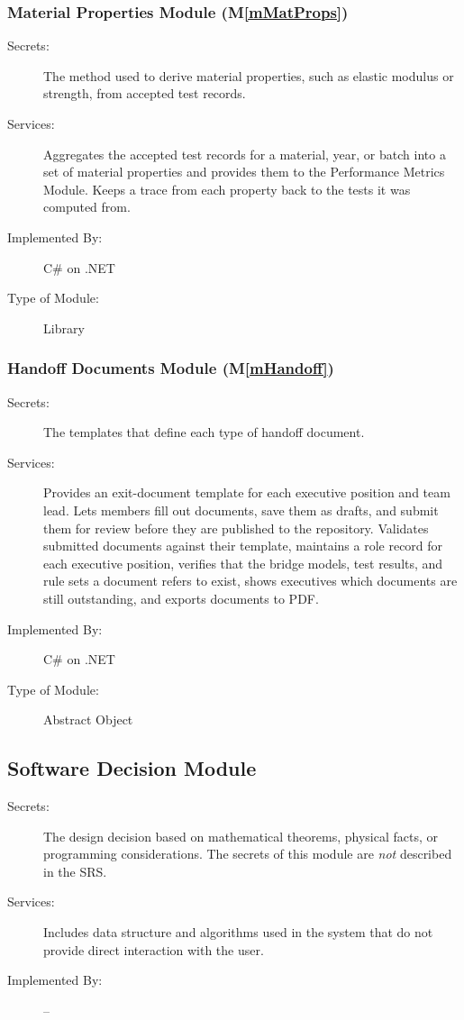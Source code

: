 \documentclass[12pt, titlepage]{article}
\begin{document}
\subsubsection{Material Properties Module (M\ref*{mMatProps})}\label{mMatProps:dec}

\begin{description}
\item[Secrets:] The method used to derive material properties, such as elastic modulus or strength, from accepted test records.
\item[Services:] Aggregates the accepted test records for a material, year, or
  batch into a set of material properties and provides them to the Performance
  Metrics Module. Keeps a trace from each property back to the tests it was
  computed from.
\item[Implemented By:] C\# on .NET
\item[Type of Module:] Library
\end{description}

\subsubsection{Handoff Documents Module (M\ref*{mHandoff})}\label{mHandoff:dec}

\begin{description}
\item[Secrets:] The templates that define each type of handoff document.
\item[Services:] Provides an exit-document template for each executive position
  and team lead. Lets members fill out documents, save them as drafts, and submit
  them for review before they are published to the repository. Validates
  submitted documents against their template, maintains a role record for each
  executive position, verifies that the bridge models, test results, and rule
  sets a document refers to exist, shows executives which documents are still
  outstanding,
  and exports documents to PDF.
\item[Implemented By:] C\# on .NET
\item[Type of Module:] Abstract Object
\end{description}

\subsection{Software Decision Module}

\begin{description}
\item[Secrets:] The design decision based on mathematical theorems, physical
  facts, or programming considerations. The secrets of this module are
  \emph{not} described in the SRS.
\item[Services:] Includes data structure and algorithms used in the system that
  do not provide direct interaction with the user. 
\item[Implemented By:] --
\end{description}
\end{document}

